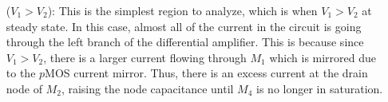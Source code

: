 \documentclass{article}
\begin{document}
\begin{itemize}
    \item [($V_1 > V_2$):] 
        This is the simplest region to analyze, which is when $V_1 > V_2$ at steady state. In this case, almost all of the current in the circuit is going through the left branch of the differential amplifier. This is because since $V_1 > V_2$, there is a larger current flowing through $M_1$ which is mirrored due to the $p$MOS current mirror. Thus, there is an excess current at the drain node of $M_2$, raising the node capacitance until $M_4$ is no longer in saturation.

\end{itemize}
\end{document}
